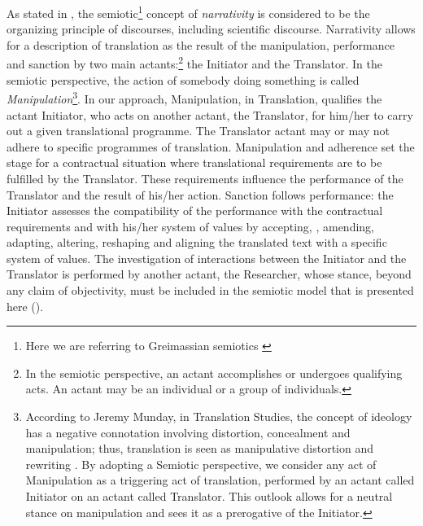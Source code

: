 \documentclass[output=paper]{LSP/langsci}
\begin{document}
As stated in \citet{Troqe2014a, Troqe2014b}, the semiotic\footnote{Here we are referring to Greimassian semiotics \citep{Greimas1970, Greimas1983, Greimas1979, Fontanille2003}} concept of \textit{narrativity} is considered to be the organizing principle of discourses, including scientific discourse. Narrativity allows for a description of translation as the result of the manipulation, performance and sanction by two main actants:\footnote{In the semiotic perspective, an actant accomplishes or undergoes qualifying acts. An actant may be an individual or a group of individuals.}  the Initiator and the Translator. In the semiotic perspective, the action of somebody doing something is called \textit{Manipulation}\footnote{According to Jeremy Munday, in Translation Studies, the concept of ideology has a negative connotation involving distortion, concealment and manipulation; thus, translation is seen as manipulative distortion and rewriting \citep[196]{Munday2007}. By adopting a Semiotic perspective, we consider any act of Manipulation as a triggering act of translation, performed by an actant called Initiator on an actant called Translator. This outlook allows for a neutral stance on manipulation and sees it as a prerogative of the Initiator.}. In our approach, Manipulation, in Translation, qualifies the actant Initiator, who acts on another actant, the Translator, for him/her to carry out a given translational programme. The Translator actant may or may not adhere to specific programmes of translation. Manipulation and adherence set the stage for a contractual situation where translational requirements are to be fulfilled by the Translator. These requirements influence the performance of the Translator and the result of his/her action. Sanction follows performance: the Initiator assesses the compatibility of the performance with the contractual requirements and with his/her system of values by accepting, , amending, adapting, altering, reshaping and aligning the translated text with a specific system of values. The investigation of interactions between the Initiator and the Translator is performed by another actant, the Researcher, whose stance, beyond any claim of objectivity, must be included in the semiotic model that is presented here ().
\end{document}
